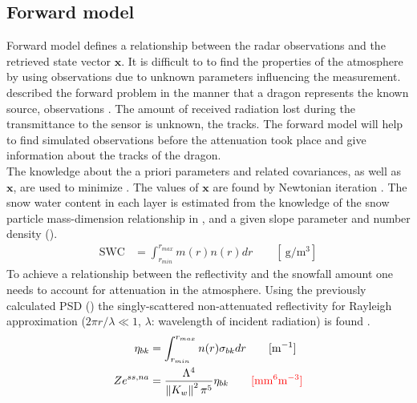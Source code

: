 \subsection{Forward model}

Forward model defines a relationship between the radar observations and the retrieved state vector $\mathbf{x}$. It is difficult to to find the properties of the atmosphere by using observations due to unknown parameters influencing the measurement. \\
\cite{stephens_remote_1994} described the forward problem in the manner that a dragon represents the known source, observations . The amount of received radiation lost during the transmittance to the sensor is unknown, the tracks. The forward model will help to find simulated observations before the attenuation took place and give information about the tracks of the dragon.  
\\
The knowledge about the a priori parameters and related covariances, as well as $\mathbf{x}$, are used to minimize . The values of $\mathbf{x}$ are found by Newtonian iteration \cite[Eq. 5]{wood_estimating_2014}.
\newline
The snow water content in each layer is estimated from the knowledge of the snow particle mass-dimension relationship in , and a given slope parameter and number density (). %
\begin{align}
	\text{SWC} & = \int_{r_{min}}^{r_{max}} m(r) n(r) dr \qquad [\SI{}{\gram\per\cubic\metre}] \label{eq:SWC}
\end{align}
To achieve a relationship between the reflectivity and the snowfall amount one needs to account for attenuation in the atmosphere. Using the previously calculated PSD () the singly-scattered non-attenuated reflectivity for Rayleigh approximation ($2\pi r/\lambda \ll 1$, $\lambda$: wavelength of incident radiation) is found \citep{lecuyer_estimation-based_2002,kulie_utilizing_2009,wood_microphysical_2015}. 
\begin{align}
	\eta_{bk} & = \int_{r_{min}}^{r_{max}} n(r) \sigma_{bk} dr \qquad [\SI{}{\per\metre}] \nonumber \\
	Ze^{ss,na} & = \frac{\Lambda^4}{\left\| K_w \right\|^2 \pi^5} \eta_{bk} \qquad \textcolor{red}{[\SI{}{\mm^6\metre^{-3}}]} \label{eq:singleZ}
\end{align}
